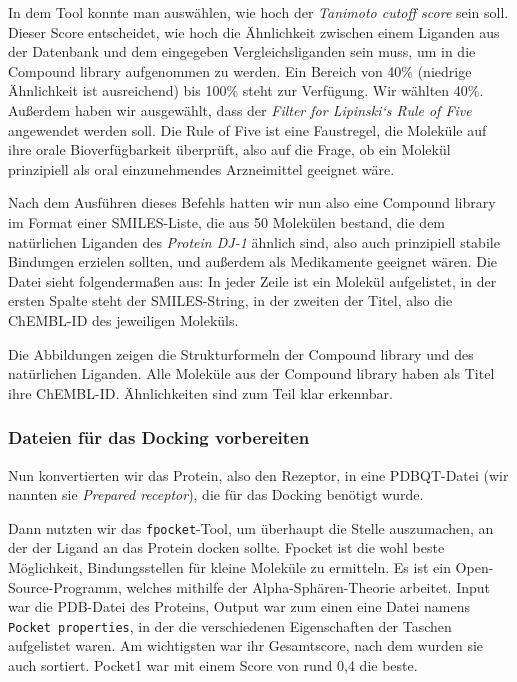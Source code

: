 \documentclass[10pt]{article}
\begin{document}
    In dem Tool konnte man auswählen, wie hoch der \emph{Tanimoto cutoff score} sein soll. Dieser Score entscheidet, wie
    hoch die Ähnlichkeit zwischen einem Liganden aus der Datenbank und dem eingegeben Vergleichsliganden sein muss,
    um in die Compound library aufgenommen zu werden. Ein Bereich von 40\% (niedrige Ähnlichkeit ist ausreichend) bis
    100\% steht zur Verfügung. Wir wählten 40\%. Außerdem haben wir ausgewählt, dass der \emph{Filter for Lipinski‘s
    Rule
    of Five} angewendet werden soll. Die Rule of Five ist eine Faustregel, die Moleküle auf ihre orale
    Bioverfügbarkeit überprüft, also auf die Frage, ob ein Molekül prinzipiell als oral einzunehmendes Arzneimittel
    geeignet wäre.\cite{28}

    Nach dem Ausführen dieses Befehls hatten wir nun also eine Compound library im Format einer SMILES-Liste, die aus
    50 Molekülen bestand, die dem natürlichen Liganden des \emph{Protein DJ-1} ähnlich sind, also auch
    prinzipiell
    stabile Bindungen erzielen sollten, und außerdem als Medikamente geeignet wären. Die Datei sieht folgendermaßen
    aus: In jeder Zeile ist ein Molekül aufgelistet, in der ersten Spalte steht der SMILES-String, in der zweiten der
    Titel, also die ChEMBL-ID des jeweiligen Moleküls.

    Die Abbildungen zeigen die Strukturformeln der Compound library und des natürlichen Liganden. Alle Moleküle aus der
    Compound library haben als Titel ihre ChEMBL-ID. Ähnlichkeiten sind zum Teil klar erkennbar.


    \subsubsection{Dateien für das Docking vorbereiten}\label{subsubsec:dateien-fuer-das-docking-vorbereiten}

    Nun konvertierten wir das Protein, also den Rezeptor, in eine PDBQT-Datei (wir nannten sie \emph{Prepared
    receptor}),
    die für das Docking benötigt wurde.

    Dann nutzten wir das \texttt{fpocket}-Tool, um überhaupt die Stelle auszumachen, an der der Ligand an das Protein
    docken
    sollte.\cite{16} Fpocket ist die wohl beste Möglichkeit, Bindungsstellen für kleine Moleküle zu ermitteln. Es
    ist ein
    Open-Source-Programm, welches mithilfe der Alpha-Sphären-Theorie arbeitet. Input war die PDB-Datei des Proteins,
    Output war zum einen eine Datei namens \texttt{Pocket properties}, in der die verschiedenen Eigenschaften der
    Taschen
    aufgelistet waren. Am wichtigsten war ihr Gesamtscore, nach dem wurden sie auch sortiert. Pocket1 war mit einem
    Score von rund 0,4 die beste.
\end{document}
